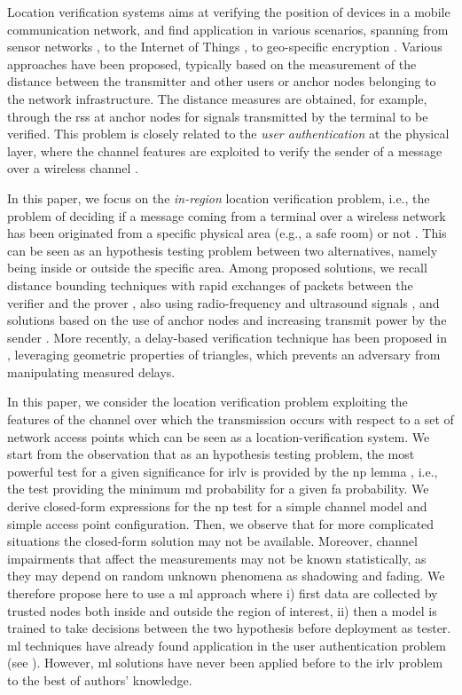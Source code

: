\documentclass[twocolumns]{IEEEtran}
\begin{document}
Location verification systems aims at verifying the position of devices in a mobile communication network, and find application in various scenarios, spanning from sensor networks \cite{Zeng-survey, 8376254}, to the Internet of Things \cite{7903611}, to geo-specific encryption \cite{quaglia}. Various approaches have been proposed, typically based on the measurement of the distance between the transmitter and other users  or  anchor nodes belonging to the network infrastructure. The distance measures are obtained, for example, through the \ac{rss} at anchor nodes for signals transmitted by the terminal to be verified.  This problem is closely related to the {\em user authentication} at the physical layer, where the channel features are exploited to verify the sender of a message over a wireless channel \cite{7270404}.

In this paper, we focus on the {\em in-region} location verification problem, i.e., the problem of deciding if a message coming from a terminal over a wireless network has been originated from a specific physical area (e.g., a safe room) or not \cite{quaglia}. This can be seen as an hypothesis testing problem between two alternatives, namely being inside or outside the specific area. Among proposed solutions, we recall distance bounding techniques with rapid exchanges of packets between the verifier and the prover \cite{Brands}, also using radio-frequency and ultrasound signals \cite{Sastry}, and solutions based on the use of anchor nodes and increasing transmit power by the sender \cite{Vora}. More recently, a delay-based verification technique has been proposed  in \cite{7145434}, leveraging geometric properties of triangles, which prevents an adversary from manipulating measured delays.  

In this paper, we consider the location verification problem exploiting the features of the channel over which the transmission occurs with respect to a set of network access points which can be seen as a location-verification system. We start from the observation that as an hypothesis testing problem, the most powerful test for a given significance for \ac{irlv} is provided by the \ac{np} lemma \cite{Neyman289}, i.e., the test providing the minimum \ac{md} probability for a given \ac{fa} probability. We derive closed-form expressions for the \ac{np} test for a simple channel model and simple access point configuration. Then, we observe that for more complicated situations the closed-form solution may not be available. Moreover,  channel impairments that affect the measurements may not be known statistically, as they may depend on random unknown phenomena as shadowing and fading. We therefore propose here to use a \ac{ml} approach where i) first data are collected by trusted nodes both inside and outside the region of interest, ii) then a model is trained to take decisions between the two hypothesis before deployment as tester. \ac{ml} techniques have already found application in the user authentication problem (see  \cite{pei2014channel, tian2015robust,Wang-17, xiao-2018, }). However, \ac{ml} solutions have never been applied before to the \ac{irlv} problem to the best of authors' knowledge. 
\end{document}

